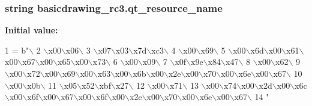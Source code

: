\subsubsection[{qt\+\_\+resource\+\_\+name}]{\setlength{\rightskip}{0pt plus 5cm}string basicdrawing\+\_\+rc3.\+qt\+\_\+resource\+\_\+name}\label{namespacebasicdrawing__rc3_a8488d1bd64741f247cd6aa3269eb2b32}
{\bfseries Initial value\+:}
\begin{DoxyCode}
1 = b\textcolor{stringliteral}{"\(\backslash\)}
2 \textcolor{stringliteral}{\(\backslash\)x00\(\backslash\)x06\(\backslash\)}
3 \textcolor{stringliteral}{\(\backslash\)x07\(\backslash\)x03\(\backslash\)x7d\(\backslash\)xc3\(\backslash\)}
4 \textcolor{stringliteral}{\(\backslash\)x00\(\backslash\)x69\(\backslash\)}
5 \textcolor{stringliteral}{\(\backslash\)x00\(\backslash\)x6d\(\backslash\)x00\(\backslash\)x61\(\backslash\)x00\(\backslash\)x67\(\backslash\)x00\(\backslash\)x65\(\backslash\)x00\(\backslash\)x73\(\backslash\)}
6 \textcolor{stringliteral}{\(\backslash\)x00\(\backslash\)x09\(\backslash\)}
7 \textcolor{stringliteral}{\(\backslash\)x0f\(\backslash\)x9e\(\backslash\)x84\(\backslash\)x47\(\backslash\)}
8 \textcolor{stringliteral}{\(\backslash\)x00\(\backslash\)x62\(\backslash\)}
9 \textcolor{stringliteral}{\(\backslash\)x00\(\backslash\)x72\(\backslash\)x00\(\backslash\)x69\(\backslash\)x00\(\backslash\)x63\(\backslash\)x00\(\backslash\)x6b\(\backslash\)x00\(\backslash\)x2e\(\backslash\)x00\(\backslash\)x70\(\backslash\)x00\(\backslash\)x6e\(\backslash\)x00\(\backslash\)x67\(\backslash\)}
10 \textcolor{stringliteral}{\(\backslash\)x00\(\backslash\)x0b\(\backslash\)}
11 \textcolor{stringliteral}{\(\backslash\)x05\(\backslash\)x52\(\backslash\)xbf\(\backslash\)x27\(\backslash\)}
12 \textcolor{stringliteral}{\(\backslash\)x00\(\backslash\)x71\(\backslash\)}
13 \textcolor{stringliteral}{\(\backslash\)x00\(\backslash\)x74\(\backslash\)x00\(\backslash\)x2d\(\backslash\)x00\(\backslash\)x6c\(\backslash\)x00\(\backslash\)x6f\(\backslash\)x00\(\backslash\)x67\(\backslash\)x00\(\backslash\)x6f\(\backslash\)x00\(\backslash\)x2e\(\backslash\)x00\(\backslash\)x70\(\backslash\)x00\(\backslash\)x6e\(\backslash\)x00\(\backslash\)x67\(\backslash\)}
14 \textcolor{stringliteral}{"}
\end{DoxyCode}
\hypertarget{namespacebasicdrawing__rc3_a3cfabe70297998acc2faa89c8b8293e3}{}
